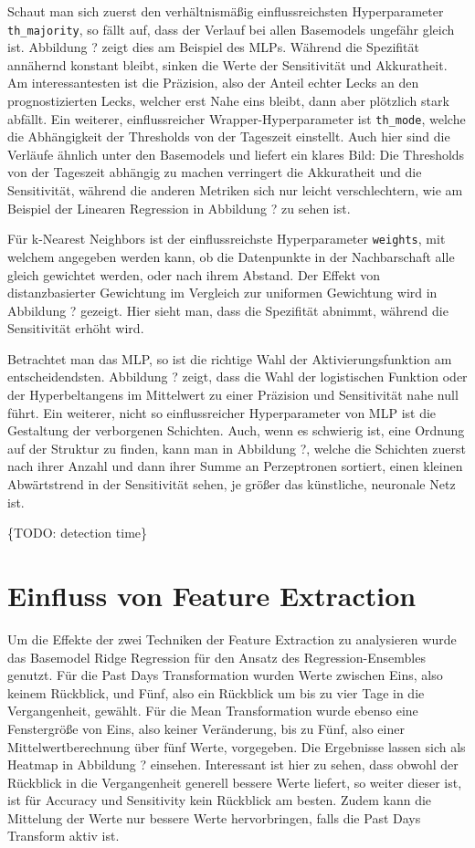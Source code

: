 Schaut man sich zuerst den verhältnismäßig einflussreichsten Hyperparameter \texttt{th\_majority}, so fällt auf,
 dass der Verlauf bei allen Basemodels ungefähr gleich ist. Abbildung ? zeigt dies am Beispiel des MLPs. Während
 die Spezifität annähernd konstant bleibt, sinken die Werte der Sensitivität und Akkuratheit. Am interessantesten
 ist die Präzision, also der Anteil echter Lecks an den prognostizierten Lecks, welcher erst Nahe eins bleibt,
 dann aber plötzlich stark abfällt. Ein weiterer, einflussreicher Wrapper-Hyperparameter ist \texttt{th\_mode},
 welche die Abhängigkeit der Thresholds von der Tageszeit einstellt. Auch hier sind die Verläufe ähnlich unter
 den Basemodels und liefert ein klares Bild: Die Thresholds von der Tageszeit abhängig zu machen verringert die
 Akkuratheit und die Sensitivität, während die anderen Metriken sich nur leicht verschlechtern, wie am Beispiel
 der Linearen Regression in Abbildung ? zu sehen ist.

Für k-Nearest Neighbors ist der einflussreichste Hyperparameter \texttt{weights}, mit welchem angegeben werden
 kann, ob die Datenpunkte in der Nachbarschaft alle gleich gewichtet werden, oder nach ihrem Abstand. Der Effekt
 von distanzbasierter Gewichtung im Vergleich zur uniformen Gewichtung wird in Abbildung ? gezeigt. Hier sieht
 man, dass die Spezifität abnimmt, während die Sensitivität erhöht wird.

Betrachtet man das MLP, so ist die richtige Wahl der Aktivierungsfunktion am entscheidendsten. Abbildung ?
 zeigt, dass die Wahl der logistischen Funktion oder der Hyperbeltangens im Mittelwert zu einer Präzision
 und Sensitivität nahe null führt. Ein weiterer, nicht so einflussreicher Hyperparameter von MLP ist die
 Gestaltung der verborgenen Schichten. Auch, wenn es schwierig ist, eine Ordnung auf der Struktur zu finden,
 kann man in Abbildung ?, welche die Schichten zuerst nach ihrer Anzahl und dann ihrer Summe an Perzeptronen
 sortiert, einen kleinen Abwärtstrend in der Sensitivität sehen, je größer das künstliche, neuronale Netz ist.

\{TODO: detection time\}

\section{Einfluss von Feature Extraction}

Um die Effekte der zwei Techniken der Feature Extraction zu analysieren wurde das Basemodel Ridge Regression
 für den Ansatz des Regression-Ensembles genutzt. Für die Past Days Transformation wurden Werte zwischen Eins,
 also keinem Rückblick, und Fünf, also ein Rückblick um bis zu vier Tage in die Vergangenheit, gewählt. Für
 die Mean Transformation wurde ebenso eine Fenstergröße von Eins, also keiner Veränderung, bis zu Fünf, also
 einer Mittelwertberechnung über fünf Werte, vorgegeben. Die Ergebnisse lassen sich als Heatmap in
 Abbildung ? einsehen. Interessant ist hier zu sehen, dass obwohl der Rückblick in die Vergangenheit generell
 bessere Werte liefert, so weiter dieser ist, ist für Accuracy und Sensitivity kein Rückblick am besten. Zudem
 kann die Mittelung der Werte nur bessere Werte hervorbringen, falls die Past Days Transform aktiv ist.